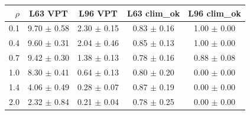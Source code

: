\begin{tabular}{rcccc}\toprule
$\rho$ & L63 VPT & L96 VPT & L63 clim\_ok & L96 clim\_ok\\
\midrule
0.1 & 9.70 $\pm$ 0.58 & 2.30 $\pm$ 0.15 & 0.83 $\pm$ 0.16 & 1.00 $\pm$ 0.00\\
0.4 & 9.60 $\pm$ 0.31 & 2.04 $\pm$ 0.46 & 0.85 $\pm$ 0.13 & 1.00 $\pm$ 0.00\\
0.7 & 9.42 $\pm$ 0.30 & 1.38 $\pm$ 0.13 & 0.78 $\pm$ 0.16 & 0.88 $\pm$ 0.08\\
1.0 & 8.30 $\pm$ 0.41 & 0.64 $\pm$ 0.13 & 0.80 $\pm$ 0.20 & 0.00 $\pm$ 0.00\\
1.4 & 4.06 $\pm$ 0.49 & 0.28 $\pm$ 0.07 & 0.87 $\pm$ 0.19 & 0.00 $\pm$ 0.00\\
2.0 & 2.32 $\pm$ 0.84 & 0.21 $\pm$ 0.04 & 0.78 $\pm$ 0.25 & 0.00 $\pm$ 0.00\\
\bottomrule\end{tabular}
